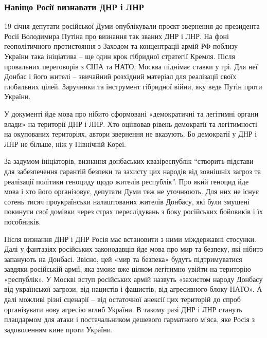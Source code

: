  
 
 
 
 

\subsubsection{Навіщо Росії визнавати ДНР і ЛНР}

19 січня депутати російської Думи опублікували проєкт звернення до президента
Росії Володимира Путіна про визнання так званих ДНР і ЛНР. На фоні
геополітичного протистояння з Заходом та концентрації армій РФ поблизу України
така ініціатива – ще один крок гібридної стратегії Кремля. Після провальних
переговорів з США та НАТО, Москва піднімає ставки у грі. Для неї Донбас і його
жителі – звичайний розхідний матеріал для реалізації своїх глобальних цілей.
Заручники та інструмент гібридної війни, яку веде Путін проти України.

У документі йде мова про нібито сформовані «демократичні та легітимні органи
влади» на території ДНР і ЛНР. Хто оцінював рівень демократії та легітимності
на окупованих територіях, автори звернення не вказують. Бо демократії у ДНР і
ЛНР не більше, ніж у Північній Кореї.


За задумом ініціаторів, визнання донбаських квазіреспублік \enquote{створить підстави
для забезпечення гарантій безпеки та захисту цих народів від зовнішніх загроз
та реалізації політики геноциду щодо жителів республік}. Про який геноцид йде
мова і хто його організовує, депутати Думи теж не уточнюють. Для них не існує
сотень тисяч проукраїнськи налаштованих жителів Донбасу, які були змушені
покинути свої домівки через страх переслідувань з боку російських бойовиків і
їх пособників.

Після визнання ДНР і ДНР Росія має встановити з ними міждержавні стосунки. Далі
у фантазіях російських законодавців йде мова про мир та безпеку, які нібито
запанують на Донбасі. Звісно, цей «мир та безпека» будуть підтримуватися
завдяки російській армії, яка зможе вже цілком легітимно увійти на територію
«республік». У Москві вступ російських армій назвуть «захистом народу Донбасу
від української загрози, від нацистів і фашистів, від агресивного блоку НАТО».
А далі можливі різні сценарії – від остаточної анексії цих територій до спроб
організувати нову агресію вглиб України. В такому разі ДНР і ЛНР стануть
плацдармом для атаки і постачальником дешевого гарматного м’яса, яке Росія з
задоволенням кине проти України.

